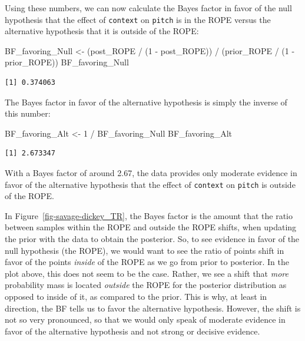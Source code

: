 \documentclass[
  doc,
  floatsintext,
  longtable,
  nolmodern,
  notxfonts,
  notimes,
  colorlinks=true,linkcolor=blue,citecolor=blue,urlcolor=blue]{apa7}
\newenvironment{Shaded}{\begin{snugshade}}{\end{snugshade}}
\newcommand{\DecValTok}[1]{\textcolor[rgb]{0.68,0.00,0.00}{#1}}
\newcommand{\NormalTok}[1]{\textcolor[rgb]{0.00,0.23,0.31}{#1}}
\newcommand{\OtherTok}[1]{\textcolor[rgb]{0.00,0.23,0.31}{#1}}
\newcommand{\SpecialCharTok}[1]{\textcolor[rgb]{0.37,0.37,0.37}{#1}}
\begin{document}
Using these numbers, we can now calculate the Bayes factor in favor of
the null hypothesis that the effect of \texttt{context} on
\texttt{pitch} is in the ROPE versus the alternative hypothesis that it
is outside of the ROPE:

\begin{Shaded}
\begin{Highlighting}[]
\NormalTok{BF\_favoring\_Null }\OtherTok{\textless{}{-}}\NormalTok{ (post\_ROPE }\SpecialCharTok{/}\NormalTok{ (}\DecValTok{1} \SpecialCharTok{{-}}\NormalTok{ post\_ROPE)) }\SpecialCharTok{/}
\NormalTok{                    (prior\_ROPE }\SpecialCharTok{/}\NormalTok{ (}\DecValTok{1} \SpecialCharTok{{-}}\NormalTok{ prior\_ROPE))}
\NormalTok{BF\_favoring\_Null}
\end{Highlighting}
\end{Shaded}

\begin{verbatim}
[1] 0.374063
\end{verbatim}

The Bayes factor in favor of the alternative hypothesis is simply the
inverse of this number:

\begin{Shaded}
\begin{Highlighting}[]
\NormalTok{BF\_favoring\_Alt }\OtherTok{\textless{}{-}} \DecValTok{1} \SpecialCharTok{/}\NormalTok{ BF\_favoring\_Null}
\NormalTok{BF\_favoring\_Alt}
\end{Highlighting}
\end{Shaded}

\begin{verbatim}
[1] 2.673347
\end{verbatim}

With a Bayes factor of around 2.67, the data provides only moderate
evidence in favor of the alternative hypothesis that the effect of
\texttt{context} on \texttt{pitch} is outside of the ROPE.

In Figure~\ref{fig-savage-dickey_TR}, the Bayes factor is the amount
that the ratio between samples within the ROPE and outside the ROPE
shifts, when updating the prior with the data to obtain the posterior.
So, to see evidence in favor of the null hypothesis (the ROPE), we would
want to see the ratio of points shift in favor of the points
\emph{inside} of the ROPE as we go from prior to posterior. In the plot
above, this does not seem to be the case. Rather, we see a shift that
\emph{more} probability mass is located \emph{outside} the ROPE for the
posterior distribution as opposed to inside of it, as compared to the
prior. This is why, at least in direction, the BF tells us to favor the
alternative hypothesis. However, the shift is not so very pronounced, so
that we would only speak of moderate evidence in favor of the
alternative hypothesis and not strong or decisive evidence.
\end{document}
